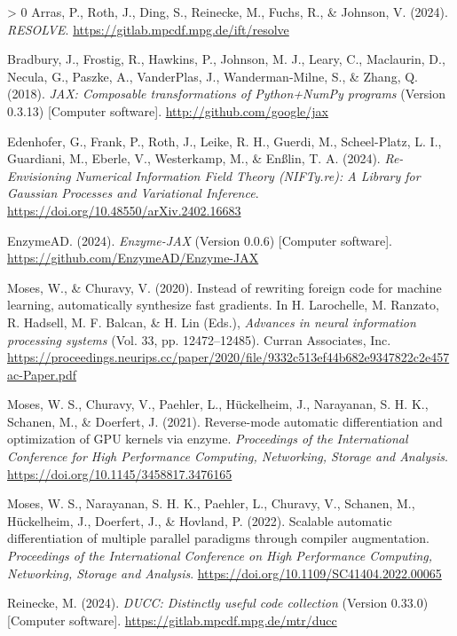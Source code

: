 \documentclass[10pt,a4paper,onecolumn]{article}
\newlength{\cslhangindent}
\newenvironment{CSLReferences}[3] %
 {%
  \setlength{\parindent}{0pt}
  \ifodd #1 \everypar{\setlength{\hangindent}{\cslhangindent}}\ignorespaces\fi
  \ifnum #2 > 0
  \setlength{\parskip}{#2\baselineskip}
  \fi
 }%
 {}
\begin{document}
\hypertarget{refs}{}
\begin{CSLReferences}{1}{0}
\leavevmode\hypertarget{ref-Resolve2024}{}%
Arras, P., Roth, J., Ding, S., Reinecke, M., Fuchs, R., \& Johnson, V.
(2024). \emph{RESOLVE}. \url{https://gitlab.mpcdf.mpg.de/ift/resolve}

\leavevmode\hypertarget{ref-Jax2018}{}%
Bradbury, J., Frostig, R., Hawkins, P., Johnson, M. J., Leary, C.,
Maclaurin, D., Necula, G., Paszke, A., VanderPlas, J., Wanderman-Milne,
S., \& Zhang, Q. (2018). \emph{{JAX}: Composable transformations of
{P}ython+{N}um{P}y programs} (Version 0.3.13) {[}Computer software{]}.
\url{http://github.com/google/jax}

\leavevmode\hypertarget{ref-Edenhofer2023NIFTyRE}{}%
Edenhofer, G., Frank, P., Roth, J., Leike, R. H., Guerdi, M.,
Scheel-Platz, L. I., Guardiani, M., Eberle, V., Westerkamp, M., \&
Enßlin, T. A. (2024). \emph{{Re-Envisioning Numerical Information Field
Theory (NIFTy.re): A Library for Gaussian Processes and Variational
Inference}}. \url{https://doi.org/10.48550/arXiv.2402.16683}

\leavevmode\hypertarget{ref-Moses2024}{}%
EnzymeAD. (2024). \emph{{Enzyme-JAX}} (Version 0.0.6) {[}Computer
software{]}. \url{https://github.com/EnzymeAD/Enzyme-JAX}

\leavevmode\hypertarget{ref-Moses2020}{}%
Moses, W., \& Churavy, V. (2020). Instead of rewriting foreign code for
machine learning, automatically synthesize fast gradients. In H.
Larochelle, M. Ranzato, R. Hadsell, M. F. Balcan, \& H. Lin (Eds.),
\emph{Advances in neural information processing systems} (Vol. 33, pp.
12472--12485). Curran Associates, Inc.
\url{https://proceedings.neurips.cc/paper/2020/file/9332c513ef44b682e9347822c2e457ac-Paper.pdf}

\leavevmode\hypertarget{ref-Moses2021}{}%
Moses, W. S., Churavy, V., Paehler, L., Hückelheim, J., Narayanan, S. H.
K., Schanen, M., \& Doerfert, J. (2021). Reverse-mode automatic
differentiation and optimization of GPU kernels via enzyme.
\emph{Proceedings of the International Conference for High Performance
Computing, Networking, Storage and Analysis}.
\url{https://doi.org/10.1145/3458817.3476165}

\leavevmode\hypertarget{ref-Moses2022}{}%
Moses, W. S., Narayanan, S. H. K., Paehler, L., Churavy, V., Schanen,
M., Hückelheim, J., Doerfert, J., \& Hovland, P. (2022). Scalable
automatic differentiation of multiple parallel paradigms through
compiler augmentation. \emph{Proceedings of the International Conference
on High Performance Computing, Networking, Storage and Analysis}.
\url{https://doi.org/10.1109/SC41404.2022.00065}

\leavevmode\hypertarget{ref-ducc0}{}%
Reinecke, M. (2024). \emph{{DUCC}: Distinctly useful code collection}
(Version 0.33.0) {[}Computer software{]}.
\url{https://gitlab.mpcdf.mpg.de/mtr/ducc}

\end{CSLReferences}
\end{document}
